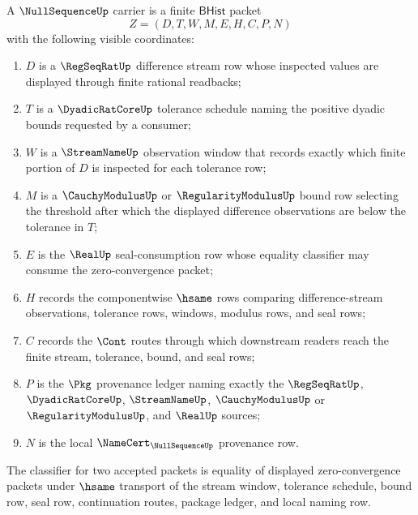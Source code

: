 \begin{definition}
\label{def:null-sequence-namecert-carrier}
A $\NullSequenceUp$ carrier is a finite $\mathsf{BHist}$ packet
$$
Z=(D,T,W,M,E,H,C,P,N)
$$
with the following visible coordinates:
\begin{enumerate}
\item $D$ is a $\RegSeqRatUp$ difference stream row whose inspected values are displayed through finite rational readbacks;
\item $T$ is a $\DyadicRatCoreUp$ tolerance schedule naming the positive dyadic bounds requested by a consumer;
\item $W$ is a $\StreamNameUp$ observation window that records exactly which finite portion of $D$ is inspected for each tolerance row;
\item $M$ is a $\CauchyModulusUp$ or $\RegularityModulusUp$ bound row selecting the threshold after which the displayed difference observations are below the tolerance in $T$;
\item $E$ is the $\RealUp$ seal-consumption row whose equality classifier may consume the zero-convergence packet;
\item $H$ records the componentwise $\hsame$ rows comparing difference-stream observations, tolerance rows, windows, modulus rows, and seal rows;
\item $C$ records the $\Cont$ routes through which downstream readers reach the finite stream, tolerance, bound, and seal rows;
\item $P$ is the $\Pkg$ provenance ledger naming exactly the $\RegSeqRatUp$, $\DyadicRatCoreUp$, $\StreamNameUp$, $\CauchyModulusUp$ or $\RegularityModulusUp$, and $\RealUp$ sources;
\item $N$ is the local $\NameCert_{\NullSequenceUp}$ provenance row.
\end{enumerate}
The classifier for two accepted packets is equality of displayed zero-convergence packets under $\hsame$ transport of the stream window, tolerance schedule, bound row, seal row, continuation routes, package ledger, and local naming row.
\end{definition}

